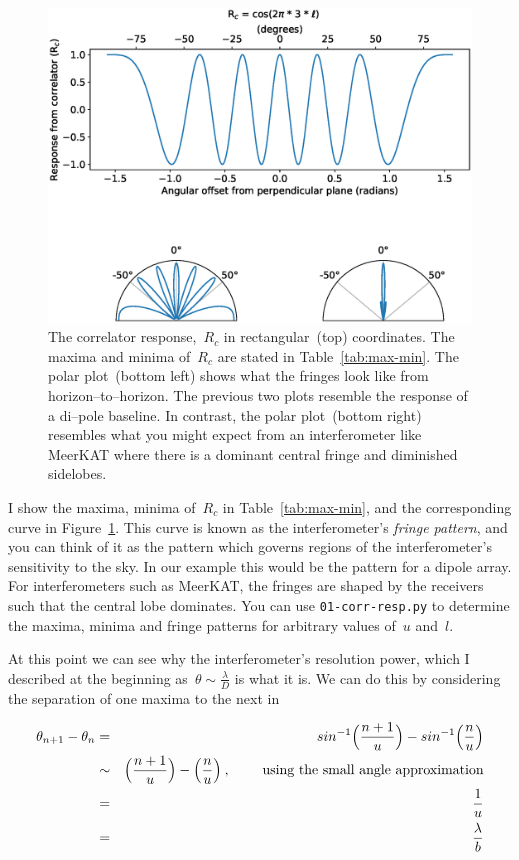 \documentclass[11pt, a4paper]{article}
\newcommand{\msp}{\mkern \medmuskip}
\begin{document}
\begin{figure}
  \centering
    \includegraphics[width=\textwidth ]{01-corr-resp.eps}
  \caption[]{The correlator response,~$R_c$ in rectangular~(top) coordinates. The maxima and minima of~$R_c$ are stated in Table~\ref{tab:max-min}. The polar plot~(bottom left) shows what the fringes look like from horizon--to--horizon. The previous two plots resemble the response of a di--pole baseline. In contrast, the polar plot~(bottom right) resembles what you might expect from an interferometer like MeerKAT where there is a dominant central fringe and diminished sidelobes.}
  \label{fig:corr-resp}
\end{figure}

I show the maxima, minima of~$R_c$ in Table~\ref{tab:max-min}, and the corresponding curve in Figure~\ref{fig:corr-resp}. This curve is known as the interferometer's \emph{fringe pattern}, and you can think of it as the pattern which governs regions of the interferometer's sensitivity to the sky. In our example this would be the pattern for a dipole array. For interferometers such as MeerKAT, the fringes are shaped by the receivers such that the central lobe dominates. You can use \texttt{01-corr-resp.py} to determine the maxima, minima and fringe patterns for arbitrary values of~$u$ and~$l$.

At this point we can see why the interferometer's resolution power, which I described at the beginning as~$\theta \sim \frac{\lambda}{D}$ is what it is. We can do this by considering the separation of one maxima to the next in

\begin{eqnarray}
  \label{eq:10}
  \theta _{n+1} - \theta _n &=& sin^{-1}\Big(\frac{n+1}{u}\Big) - sin^{-1}\Big(\frac{n}{u}\Big) \nonumber \\
                           &\sim & \Big(\frac{n+1}{u}\Big) - \Big(\frac{n}{u}\Big) \msp , \hspace{0.8cm} \mbox{using the small angle approximation} \nonumber \\
                           &=& \frac{1}{u}       \nonumber \\
                           &=& \frac{\lambda}{b} \nonumber
\end{eqnarray}
\end{document}
